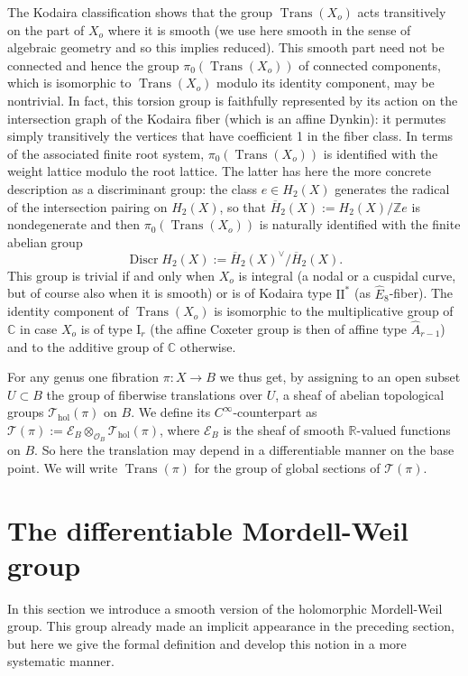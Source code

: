 \documentclass[10pt,letterpaper]{amsart}
\numberwithin{equation}{section}
\def\CC{{\mathbb C}}
\def\RR{{\mathbb R}}
\def\ZZ{{\mathbb Z}}
\def\hol{\mathrm{hol}}
\def\Ecal{{\mathcal E}}
\def\Ocal{{\mathcal O}}
\def\Tscr{{\mathscr T}}
\newcommand\discr{\operatorname{Discr}}
\newcommand\Trans{\operatorname{Trans}}
\theoremstyle{remark}
\begin{document}
The Kodaira classification shows that the group $\Trans(X_o)$
acts transitively on the part of $X_o$ where it is smooth (we use here smooth in the sense 
of algebraic geometry and so this implies reduced). 
This smooth part need not be connected and hence the group 
$\pi_0(\Trans(X_o))$ of connected components, which is isomorphic to 
$\Trans(X_o)$ modulo its identity component, may be nontrivial. In fact, this torsion group is faithfully represented by its action 
on the intersection graph of the Kodaira fiber 
(which is an affine Dynkin): it permutes  simply transitively the vertices that  have coefficient 1 in the fiber class. In terms of the associated finite root system,  $\pi_0(\Trans(X_o))$ is  identified with the weight lattice modulo the root lattice. The latter  has here the more concrete description  as a discriminant group:  the class  $e\in H_2(X)$ generates the radical of the intersection pairing on $H_2(X)$, so that $\overline H_2(X):=H_2(X)/\ZZ e$ is  nondegenerate  and 
then $\pi_0(\Trans(X_o))$ is naturally identified with the finite abelian group
\[
\discr H_2(X):=\overline H_2(X)^\vee/\overline H_2(X).
\]
This group is trivial if and only when $X_o$ is integral (a nodal or a cuspidal curve, but of course also when it is smooth) or is of Kodaira type $\text{II}^*$
(as $\hat E_8$-fiber).
The identity component of $\Trans(X_o)$ is isomorphic to the multiplicative group of $\CC$ in case $X_o$ is of type $\textrm{I}_r$  (the affine Coxeter group is then of affine type $\hat A_{r-1}$) and to the  additive  group of $\CC$ otherwise.

For any genus one fibration $\pi :X\to B$  we thus get,  by assigning to an open subset $U\subset B$ the group of fiberwise translations  over $U$, a  sheaf of abelian topological groups  $\Tscr_\hol(\pi)$ on $B$. We define its 
$C^\infty$-counterpart as  $\Tscr(\pi):=\Ecal_B\otimes_{\Ocal_B}\Tscr_\hol(\pi)$, where $\Ecal_B$ is the sheaf of smooth 
$\RR$-valued functions on $B$. So here the translation may depend in 
a differentiable manner on the base point. 
We will write $\Trans(\pi)$ for the group of global sections of $\Tscr(\pi)$.




\section{The differentiable Mordell-Weil group }
\label{section:MW}
In this section we introduce a smooth version of the holomorphic Mordell-Weil group.  This group already made an implicit  appearance in the preceding section, but here we give the formal definition and develop this notion in a more systematic manner.
\end{document}
